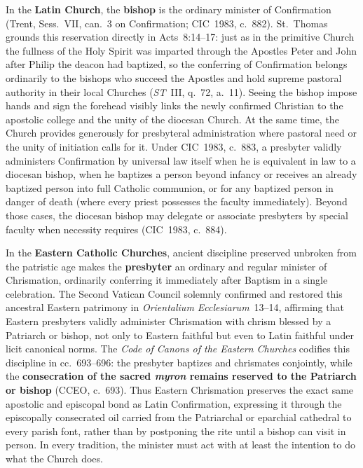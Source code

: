 In the \textbf{Latin Church}, the \textbf{bishop} is the ordinary minister of Confirmation (Trent, Sess.~VII, can.~3 on Confirmation; CIC~1983, c.~882). St.~Thomas grounds this reservation directly in Acts~8:14--17: just as in the primitive Church the fullness of the Holy Spirit was imparted through the Apostles Peter and John after Philip the deacon had baptized, so the conferring of Confirmation belongs ordinarily to the bishops who succeed the Apostles and hold supreme pastoral authority in their local Churches (\emph{ST}~III, q.~72, a.~11). Seeing the bishop impose hands and sign the forehead visibly links the newly confirmed Christian to the apostolic college and the unity of the diocesan Church. At the same time, the Church provides generously for presbyteral administration where pastoral need or the unity of initiation calls for it. Under CIC~1983, c.~883, a presbyter validly administers Confirmation by universal law itself when he is equivalent in law to a diocesan bishop, when he baptizes a person beyond infancy or receives an already baptized person into full Catholic communion, or for any baptized person in danger of death (where every priest possesses the faculty immediately). Beyond those cases, the diocesan bishop may delegate or associate presbyters by special faculty when necessity requires (CIC~1983, c.~884).

In the \textbf{Eastern Catholic Churches}, ancient discipline preserved unbroken from the patristic age makes the \textbf{presbyter} an ordinary and regular minister of Chrismation, ordinarily conferring it immediately after Baptism in a single celebration. The Second Vatican Council solemnly confirmed and restored this ancestral Eastern patrimony in \emph{Orientalium Ecclesiarum}~13--14, affirming that Eastern presbyters validly administer Chrismation with chrism blessed by a Patriarch or bishop, not only to Eastern faithful but even to Latin faithful under licit canonical norms. The \emph{Code of Canons of the Eastern Churches} codifies this discipline in cc.~693--696: the presbyter baptizes and chrismates conjointly, while the \textbf{consecration of the sacred \emph{myron} remains reserved to the Patriarch or bishop} (CCEO, c.~693). Thus Eastern Chrismation preserves the exact same apostolic and episcopal bond as Latin Confirmation, expressing it through the episcopally consecrated oil carried from the Patriarchal or eparchial cathedral to every parish font, rather than by postponing the rite until a bishop can visit in person. In every tradition, the minister must act with at least the intention to do what the Church does.

